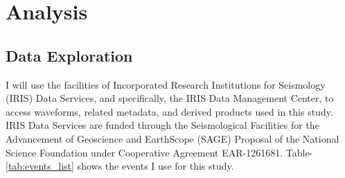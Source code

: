 \documentclass[12pt]{article}
\begin{document}
    
        \section{Analysis}
        \subsection{Data Exploration}
        I will use the facilities of Incorporated Research Institutions for Seismology (IRIS) Data Services, and specifically, the IRIS Data Management Center, to access waveforms, related metadata, and derived products used in this study. IRIS Data Services are funded through the Seismological Facilities for the Advancement of Geoscience and EarthScope (SAGE) Proposal of the National Science Foundation under Cooperative Agreement EAR-1261681. Table-\ref{tab:events_list} shows the events I use for this study. 
    
\end{document}
